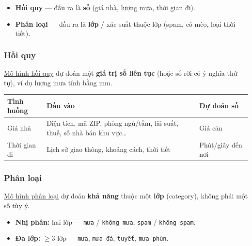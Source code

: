 \documentclass[12pt,a4paper]{article}
\begin{document}
\begin{tinhchat}[title={Hai nhánh chính của có giám sát}]
\begin{itemize}
  \item \textbf{Hồi quy} --- đầu ra là \textbf{số} (giá nhà, lượng mưa, thời gian đi).
  \item \textbf{Phân loại} --- đầu ra là \textbf{lớp} / xác suất thuộc lớp (spam, có mèo, loại thời tiết).
\end{itemize}
\end{tinhchat}

\subsubsection{Hồi quy}

\begin{dinhnghia}[title={Mô hình hồi quy}]
\href{https://developers.google.com/machine-learning/glossary\#regression-model}{Mô hình hồi quy} dự đoán một \textbf{giá trị số liên tục} (hoặc số rời có ý nghĩa thứ tự), ví dụ lượng mưa tính bằng mm.
\end{dinhnghia}

\begin{ungdung}[title={Ví dụ hồi quy}]
\begin{tabularx}{\textwidth}{@{}>{\raggedright\arraybackslash}p{2.8cm} X >{\raggedright\arraybackslash}p{3.2cm}@{}}
\toprule
\textbf{Tình huống} & \textbf{Đầu vào} & \textbf{Dự đoán số} \\
\midrule
Giá nhà &
Diện tích, mã ZIP, phòng ngủ/tắm, lãi suất, thuế, số nhà bán khu vực\ldots &
Giá căn \\
Thời gian đi &
Lịch sử giao thông, khoảng cách, thời tiết &
Phút/giây đến nơi \\
\bottomrule
\end{tabularx}
\end{ungdung}

\subsubsection{Phân loại}

\begin{dinhnghia}[title={Mô hình phân loại}]
\href{https://developers.google.com/machine-learning/glossary\#classification-model}{Mô hình phân loại} dự đoán \textbf{khả năng} thuộc một \textbf{lớp} (category), không phải một số tùy ý.
\end{dinhnghia}

\begin{tinhchat}[title={Nhị phân và đa lớp}]
\begin{itemize}
  \item \textbf{Nhị phân:} hai lớp --- \texttt{mưa} / \texttt{không mưa}, \texttt{spam} / \texttt{không spam}.
  \item \textbf{Đa lớp:} $\geq 3$ lớp --- \texttt{mưa}, \texttt{mưa đá}, \texttt{tuyết}, \texttt{mưa phùn}.
\end{itemize}
\end{tinhchat}
\end{document}
